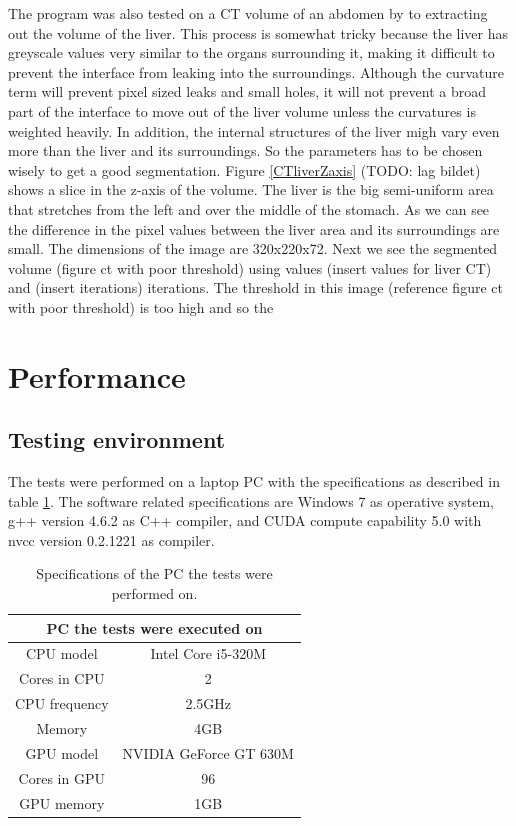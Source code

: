 The program was also tested on a CT volume of an abdomen by to extracting out the volume of the liver. This process is somewhat tricky because the liver has greyscale values very similar to the organs surrounding it, making it difficult to prevent the interface from leaking into the surroundings. Although the curvature term will prevent pixel sized leaks and small holes, it will not prevent a broad part of the interface to move out of the liver volume unless the curvatures is weighted heavily. In addition, the internal structures of the liver migh vary even more than the liver and its surroundings. So the parameters has to be chosen wisely to get a good segmentation. Figure \ref{CTliverZaxis} (TODO: lag bildet) shows a slice in the z-axis of the volume. The liver is the big semi-uniform area that stretches from the left and over the middle of the stomach. As we can see the difference in the pixel values between the liver area and its surroundings are small. The dimensions of the image are 320x220x72. Next we see the segmented volume (figure ct with poor threshold) using values (insert values for liver CT) and (insert iterations) iterations. The threshold in this image (reference figure ct with poor threshold) is too high and so the 

\section{Performance}
\subsection*{Testing environment}
The tests were performed on a laptop PC with the specifications as described in table \ref{pcSpecs}. The software related specifications are Windows 7 as operative system, g++ version 4.6.2 as C++ compiler, and CUDA compute capability 5.0 with nvcc version 0.2.1221 as compiler.

\begin{table}[h!]
	\begin{tabular}{| c | c |} 
	\hline
	\multicolumn{2}{|c|}{PC the tests were executed on} \\
	\hline
	CPU model & Intel Core i5-320M \\
	\hline
	Cores in CPU & 2 \\
	\hline
	CPU frequency & 2.5GHz \\
	\hline
	Memory & 4GB \\
	\hline
	GPU model & NVIDIA GeForce GT 630M \\
	\hline
	Cores in GPU & 96 \\
	\hline
	GPU memory & 1GB \\
	\hline
	\end{tabular}
	\caption{Specifications of the PC the tests were performed on.}
	\label{pcSpecs}
\end{table}


